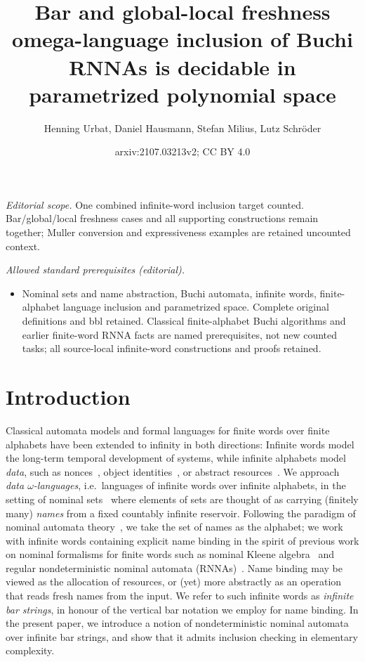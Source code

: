 \documentclass[10pt,a4paper]{amsart}
\title{Bar and global-local freshness omega-language inclusion of Buchi RNNAs is decidable in parametrized polynomial space}
\author{Henning Urbat, Daniel Hausmann, Stefan Milius, Lutz Schröder}
\date{arxiv:2107.03213v2; CC BY 4.0}
\numberwithin{equation}{section}
\newcommand{\+}[1]{\mathcal{#1}\xspace}
\theoremstyle{definition}
\begin{document}
\maketitle
\noindent\textit{Editorial scope.} One combined infinite-word inclusion target counted. Bar/global/local freshness cases and all supporting constructions remain together; Muller conversion and expressiveness examples are retained uncounted context.\par\medskip
\noindent\textit{Allowed standard prerequisites (editorial).}\begin{itemize}
\item Nominal sets and name abstraction, Buchi automata, infinite words, finite-alphabet language inclusion and parametrized space. Complete original definitions and bbl retained. Classical finite-alphabet Buchi algorithms and earlier finite-word RNNA facts are named prerequisites, not new counted tasks; all source-local infinite-word constructions and proofs retained.
\end{itemize}\medskip
\section{Introduction}\label{sec:intro}

Classical automata models and formal languages for finite words over
finite alphabets have been extended to infinity in both directions:
Infinite words model the long-term temporal development of systems,
while infinite alphabets model \emph{data}, such as
nonces~\cite{KurtzEA07}, object identities~\cite{GrigoreEA13}, or
abstract resources~\cite{CianciaSammartino14}. We approach \emph{data
  $\omega$-languages}, i.e.~languages of infinite words over infinite
alphabets, in the setting of nominal sets~\cite{Pitts13} where elements
of sets are thought of as carrying (finitely many) \emph{names} from a
fixed countably infinite reservoir. Following the paradigm of nominal
automata theory~\cite{BojanczykEA14}, we take the set of names as the
alphabet; we work with infinite words containing explicit name binding
in the spirit of previous work on nominal formalisms for finite words
such as nominal Kleene algebra~\cite{GabbayCiancia11} and regular
nondeterministic nominal automata (RNNAs)~\cite{SchroderEA17}. Name
binding may be viewed as the allocation of resources, or (yet) more
abstractly as an operation that reads fresh names from the input. We
refer to such infinite words as \emph{infinite bar strings}, in honour
of the vertical bar notation we employ for name binding. In the
present paper, we introduce a notion of nondeterministic nominal
automata over infinite bar strings, and show that it admits inclusion
checking in elementary complexity.
\end{document}
